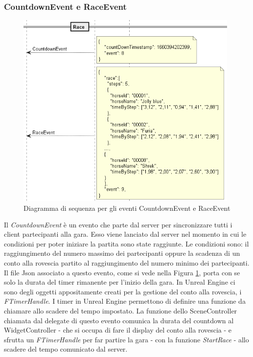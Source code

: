         \subsubsection{CountdownEvent e RaceEvent}

        \begin{figure}[!ht]\label{img:CountdownEvent}
            \centering
            \includegraphics[width=11cm]{figure/CountdownEvent.png}
            \caption{Diagramma di sequenza per gli eventi CountdownEvent e RaceEvent}
        \end{figure}

        Il \textit{CountdownEvent} è un evento che parte dal server per sincronizzare tutti i client partecipanti alla gara.
        Esso viene lanciato dal server nel momento in cui le condizioni per poter iniziare la partita sono state raggiunte.
        Le condizioni sono: il raggiungimento del numero massimo dei partecipanti oppure la scadenza di un conto alla rovescia partito al raggiungimento del numero minimo dei partecipanti.
        Il file Json associato a questo evento, come si vede nella Figura \ref{img:CountdownEvent}, porta con se solo la durata del timer rimanente per l'inizio della gara.
        In Unreal Engine ci sono degli oggetti appositamente creati per la gestione del conto alla rovescia, i \textit{FTimerHandle}.
        I timer in Unreal Engine permettono di definire una funzione da chiamare allo scadere del tempo impostato.
        La funzione dello SceneController chiamata dal delegate di questo evento comunica la durata del countdown al WidgetController - che si occupa di fare il display del conto alla rovescia - e sfrutta un \textit{FTimerHandle} per far partire la gara - con la funzione \textit{StartRace} - allo scadere del tempo comunicato dal server.

